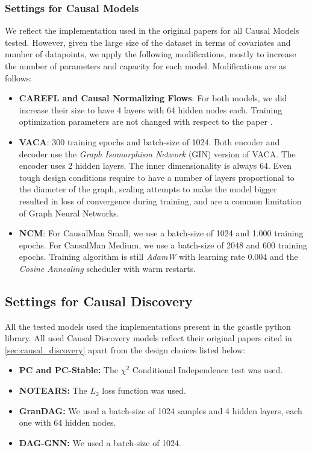 \subsubsection{Settings for Causal Models}

We reflect the implementation used in the original papers for all Causal Models tested. However, given the large size of the dataset in terms of covariates and number of datapoints, we apply the following modifications, mostly to increase the number of parameters and capacity for each model. Modifications are as follows:
 
\begin{itemize}
    \item \textbf{CAREFL and Causal Normalizing Flows}: For both models, we did increase their size to have 4 layers with 64 hidden nodes each. Training optimization parameters are not changed with respect to the paper \citep{causalnormjavaloy2023}.
    \item \textbf{VACA}: 300 training epochs and batch-size of 1024. Both encoder and decoder use the \textit{Graph Isomorphism Network} (GIN) \citep{xu2018how} version of VACA. The encoder uses 2 hidden layers. The inner dimensionality is always 64. Even tough design conditions require to have a number of layers proportional to the diameter of the graph, scaling attempts to make the model bigger resulted in loss of convergence during training, and are a common limitation of Graph Neural Networks.
    \item \textbf{NCM}: For CausalMan Small, we use a batch-size of 1024 and 1.000 training epochs. For CausalMan Medium, we use a batch-size of 2048 and 600 training epochs. Training algorithm is still \textit{AdamW} \citep{loshchilov2019decoupledweightdecayregularization} with learning rate 0.004 and the \textit{Cosine Annealing} scheduler with warm restarts.
\end{itemize}
 
\subsection{Settings for Causal Discovery} \label{sec:appendix_code_discovery}
 
All the tested models used the implementations present in the gcastle python library. All used Causal Discovery models reflect their original papers cited in \ref{sec:causal_discovery} apart from the design choices listed below:
\begin{itemize}
    \item \textbf{PC and PC-Stable:} The $\chi^2$ Conditional Independence test was used.
    \item \textbf{NOTEARS:} The $L_2$ loss function was used.
    \item \textbf{GranDAG:} We used a batch-size of 1024 samples and 4 hidden layers, each one with 64 hidden nodes.
    \item \textbf{DAG-GNN:} We used a batch-size of 1024.
\end{itemize}

